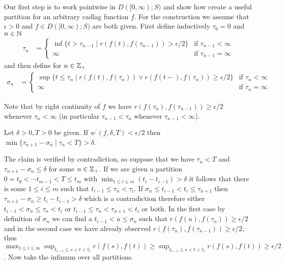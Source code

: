 Our first step is to work pointwise in $D([0,\infty); S)$ and show how create a useful partition for an arbitrary cadlag function $f$.  For the construction we assume that $\epsilon > 0$ and $f \in D([0,\infty); S)$ are both given.  First define inductively $\tau_0=0$ and $n \in \mathbb{N}$
\begin{align*}
\tau_{n} &= \begin{cases}
\inf \lbrace t > \tau_{n-1} \mid r(f(t), f(\tau_{n-1})) > \epsilon/2 \rbrace & \text{if $\tau_{n-1} < \infty$} \\
\infty & \text{if $\tau_{n-1} = \infty$}
\end{cases}
\end{align*}
and then define for $n \in \mathbb{Z}_+$
\begin{align*}
\sigma_{n} &= \begin{cases}
\sup \lbrace t \leq \tau_{n} \mid r(f(t), f(\tau_{n})) \vee r(f(t-), f(\tau_{n}))   \geq \epsilon/2 \rbrace & \text{if $\tau_n < \infty$} \\
\infty & \text{if $\tau_n = \infty$}
\end{cases}
\end{align*}

Note that by right continuity of $f$ we have $r(f(\tau_n), f(\tau_{n-1})) \geq \epsilon/2$ whenever $\tau_n < \infty$ (in particular $\tau_{n-1} < \tau_n$ whenever $\tau_{n-1} < \infty$).

\begin{clm}Let $\delta > 0, T>0$ be given. If $w^{\prime}(f,\delta, T) < \epsilon/2$  then $\min \lbrace \tau_{n+1} - \sigma_n \mid \tau_n < T \rbrace > \delta$.  
\end{clm}
The claim is verified by contradiction, so suppose that we have $\tau_n < T$ and $\tau_{n+1} - \sigma_n \leq \delta$ for some $n \in \mathbb{Z}_+$.  If we are given a partition
$0=t_0 < \dotsb t_{m-1} < T \leq t_m$ with $\min_{1 \leq i \leq m} (t_i-t_{i-1}) > \delta$ it follows that there is some $1 \leq i \leq m$ such that $t_{i-1} \leq \tau_n < \tau_i$.  If $\sigma_n \leq t_{i-1} < t_i \leq \tau_{n+1}$ then $\tau_{n+1} - \sigma_n \geq t_i - t_{i-1} > \delta$ which is a contradiction therefore either $t_{i-1} < \sigma_n \leq \tau_n < t_i$ or 
$t_{i-1} \leq \tau_n < \tau_{n+1} < t_i$ or both.  In the first case by definition of $\sigma_n$ we can find a $t_{i-1} < u \leq \sigma_n$ such that $r(f(u), f(\tau_n)) \geq \epsilon/2$ and in the second case we have already observed $r(f(\tau_n), f(\tau_{n-1})) \geq \epsilon/2$; thus $\max_{1 \leq i \leq m} \sup_{t_{i-1} \leq s < t < t_{i}} r(f(s), f(t)) \geq \sup_{t_{i-1} \leq s < t < t_{i}} r(f(s), f(t)) \geq \epsilon/2$.  Now take the infimum over all partitions.

